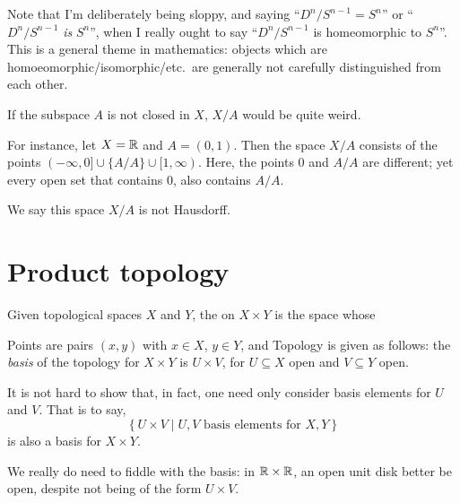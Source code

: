 \begin{abuse}
	Note that I'm deliberately being sloppy, and saying
	``$D^n / S^{n-1} = S^n$'' or ``$D^n / S^{n-1}$ \emph{is} $S^n$'',
	when I really ought to say ``$D^n / S^{n-1}$ is homeomorphic to $S^n$''.
	This is a general theme in mathematics:
	objects which are homoeomorphic/isomorphic/etc.\ are generally
	not carefully distinguished from each other.
\end{abuse}

\begin{example}
	\label{ex:quotient_by_open_set}
	If the subspace $A$ is not closed in $X$, $X/A$ would be quite weird.

	For instance, let $X = \mathbb R$ and $A = (0, 1)$. Then the space $X/A$ consists of the points
	$(-\infty, 0] \cup \{A/A\} \cup [1, \infty)$.
	Here, the points $0$ and $A/A$ are different; yet every open set that contains $0$, also
	contains $A/A$.

	We say this space $X/A$ is not Hausdorff.
\end{example}

\section{Product topology}

\begin{definition}
	Given topological spaces $X$ and $Y$,
	the  on $X \times Y$ is the space whose
	\begin{itemize}
		\ii Points are pairs $(x,y)$ with $x \in X$, $y \in Y$, and
		\ii Topology is given as follows: the \emph{basis} of
		the topology for $X \times Y$ is $U \times V$,
		for $U \subseteq X$ open and $V \subseteq Y$ open.
	\end{itemize}
\end{definition}

\begin{remark}
	It is not hard to show that, in fact,
	one need only consider basis elements for $U$ and $V$.
	That is to say,
	\[ \left\{ U \times V \mid
		U,V \text{ basis elements for } X,Y \right\} \]
	is also a basis for $X \times Y$.

	We really do need to fiddle with the basis:
	in $\mathbb R \times \mathbb R$, an open unit disk better be open,
	despite not being of the form $U \times V$.
\end{remark}

